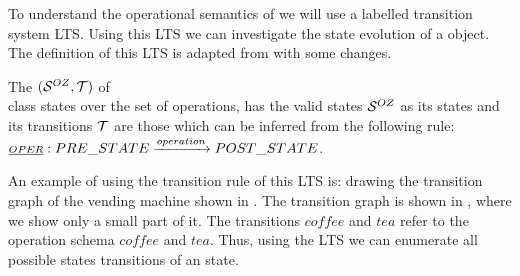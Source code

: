 To understand the operational semantics of \oz{} we will use  a labelled transition system LTS. Using this LTS we can investigate the state evolution of a \oz{} object. The definition of this LTS is adapted from  with some changes.

\begin{definition}[LTS of \oz{}]
\label{def_oz_trans_system}
The  $(\stats,\traces)$ of \oz{} \\class states over the set of operations, has the valid states $\mathcal S^{OZ}$ as its states and its transitions $\traces$ are those which can be inferred from the following rule: \\$\underline{\scriptstyle{OPER}}: PRE\_STATE \xrightarrow{operation} POST\_STATE$.
\end{definition}
An example of using the transition rule of this LTS is: drawing the transition graph of the vending machine shown in  . The transition graph is shown in , where we show only a small part of it. The transitions $coffee$ and $tea$ refer to the operation schema $coffee$ and $tea$. Thus, using the LTS we can enumerate all possible states transitions of an \oz{} state.


